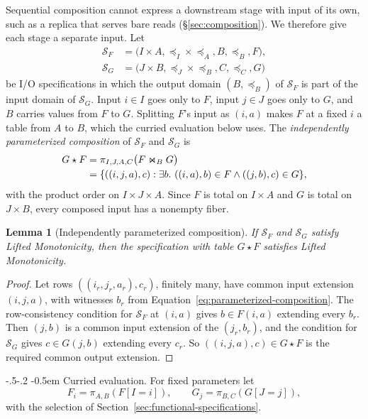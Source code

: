 \documentclass[sigconf]{cidr-2027}
\makeatletter
\newtheorem{lemma}{Lemma}
\theoremstyle{remark}
\renewcommand\paragraph{\@startsection{paragraph}{4}{\z@}%
  {-.5\baselineskip \@plus -2\p@ \@minus -.2\p@}%
  {-0.5em}%
  {\normalfont\bfseries}}
\newcommand{\indesc}{input extension\xspace} %
\newcommand{\outrelpart}{extending\xspace}    %
\newcommand{\outnoun}{output extension\xspace}%
\newcommand{\Spec}{\mathcal{S}}
\newcommand{\spectype}[1][]{I/O specification#1\xspace}
\makeatother
\begin{document}
Sequential composition cannot express a downstream stage with input of its
own, such as a replica that serves bare reads (\S\ref{sec:composition}). We
therefore give each stage a separate input. Let
\begin{align*}
  \Spec_F&=\bigl(I\times A,\preceq_I\times\preceq_A,B,\preceq_B,F\bigr),\\
  \Spec_G&=\bigl(J\times B,\preceq_J\times\preceq_B,C,\preceq_C,G\bigr)
\end{align*}
be \spectype[s] in which the output domain $(B,\preceq_B)$ of $\Spec_F$ is
part of the input domain of $\Spec_G$. Input $i\in I$ goes only to $F$,
input $j\in J$ goes only to $G$, and $B$ carries values from $F$ to $G$. Splitting $F$'s input as $(i,a)$ makes $F$ at a fixed $i$ a table from $A$ to
$B$, which the curried evaluation below uses. The \emph{independently
parameterized composition} of $\Spec_F$ and $\Spec_G$ is
\begin{align}
  G\star F
  &=\pi_{I,J,A,C}\bigl(F\Join_{B}G\bigr) \notag\\
  &=\{((i,j,a),c):\exists b.\ ((i,a),b)\in F
                         \land ((j,b),c)\in G\},
  \label{eq:parameterized-composition}
\end{align}
with the product order on $I\times J\times A$. Since $F$ is total on
$I\times A$ and $G$ is total on $J\times B$, every composed input has a
nonempty fiber.

\begin{lemma}[Independently parameterized composition]
\label{lem:parameterized-composition}
If $\Spec_F$ and $\Spec_G$ satisfy Lifted Monotonicity, then the specification
with table $G\star F$ satisfies Lifted Monotonicity.
\end{lemma}

\begin{proof}
Let rows $((i_r,j_r,a_r),c_r)$, finitely many, have common \indesc $(i,j,a)$,
with witnesses $b_r$ from Equation~\ref{eq:parameterized-composition}. The
row-consistency condition for $\Spec_F$ at $(i,a)$ gives $b\in F(i,a)$
\outrelpart every $b_r$. Then $(j,b)$ is a common \indesc of the
$(j_r,b_r)$, and the condition for $\Spec_G$ gives $c\in G(j,b)$ \outrelpart
every $c_r$. So $((i,j,a),c)\in G\star F$ is the required common \outnoun.
\end{proof}

\paragraph{Curried evaluation.}
For fixed parameters let
\begin{equation}
  F_i=\pi_{A,B}(F[I=i]),
  \qquad
  G_j=\pi_{B,C}(G[J=j]),
  \label{eq:curried-fibers}
\end{equation}
with the selection of Section~\ref{sec:functional-specifications}.
\end{document}
